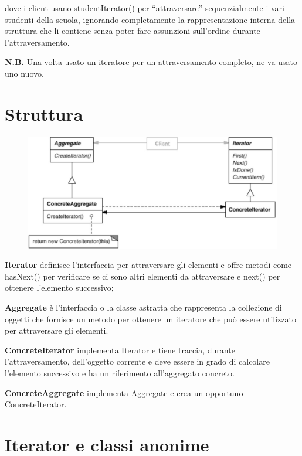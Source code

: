 dove i client usano studentIterator() per “attraversare” sequenzialmente i vari studenti della scuola, ignorando completamente la rappresentazione interna della 
struttura che li contiene senza poter fare assunzioni sull’ordine durante l’attraversamento.

\medskip
\textbf{N.B.} Una volta usato un iteratore per un attraversamento completo, ne va usato uno nuovo.

\section{Struttura}

\begin{figure}[H]
    \centering
    \includegraphics[width=0.5\linewidth]{../../immagini/iterator/struttura_visitor}
\end{figure}

\textbf{Iterator} definisce l'interfaccia per attraversare gli elementi e offre metodi come hasNext() per verificare se ci sono altri elementi da attraversare e next()
per ottenere l'elemento successivo;

\textbf{Aggregate} è l'interfaccia o la classe astratta che rappresenta la collezione di oggetti che fornisce un metodo per ottenere un iteratore che può essere 
utilizzato per attraversare gli elementi.

\textbf{ConcreteIterator} implementa Iterator e tiene traccia, durante l’attraversamento, dell’oggetto corrente e deve essere in grado di calcolare l’elemento 
successivo e ha un riferimento all’aggregato concreto.

\textbf{ConcreteAggregate} implementa Aggregate e crea un opportuno ConcreteIterator.

\section{Iterator e classi anonime}

